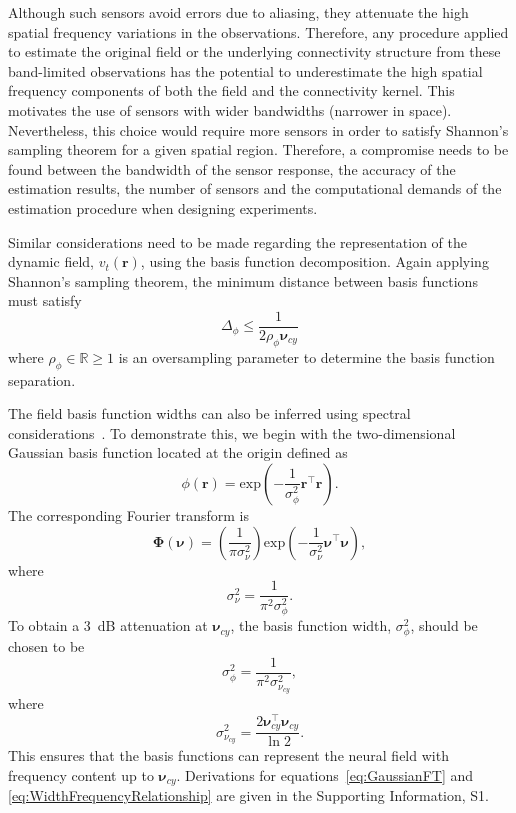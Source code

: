 \documentclass[10pt]{article}
\begin{document}
Although such sensors avoid errors due to aliasing, they attenuate the high spatial frequency variations in the observations. Therefore, any procedure applied to estimate the original field or the underlying connectivity structure from these band-limited observations has the potential to underestimate the high spatial frequency components of both the field and the connectivity kernel. This motivates the use of sensors with wider bandwidths (narrower in space). Nevertheless, this choice would require more sensors in order to satisfy Shannon's sampling theorem for a given spatial region. Therefore, a compromise needs to be found between the bandwidth of the sensor response, the accuracy of the estimation results, the number of sensors and the computational demands of the estimation procedure when designing experiments.

Similar considerations need to be made regarding the representation of the dynamic field, $v_t(\mathbf{r})$, using the basis function decomposition. Again applying Shannon's sampling theorem, the minimum distance between basis functions must satisfy 
\begin{equation}\label{eq:BasisFunctionSeparation}
	\Delta_{\phi} \leq \frac{1}{2\rho_{\phi}\boldsymbol{\nu}_{cy}}
\end{equation}
where $\rho_{\phi} \in \mathbb{R} \ge 1$ is an oversampling parameter to determine the basis function separation. 

The field basis function widths can also be inferred using spectral considerations~\cite{Sanner1992,Scerri2009}. To demonstrate this, we begin with the two-dimensional Gaussian basis function located at the origin defined as
\begin{equation}\label{eq:BasisFunctionAtOrigin}
 \phi(\mathbf r)=\mathrm{exp}\left({-\frac{1}{\sigma_{\phi}^2} \mathbf r^\top\mathbf r}\right).
\end{equation}
The corresponding Fourier transform is
\begin{equation}\label{eq:GaussianFT}
\boldsymbol\Phi(\boldsymbol \nu)=\left(\frac{1}{\pi\sigma_{\nu}^2}\right)\mathrm{exp}\left(-\frac{1}{\sigma_{\nu}^2}\boldsymbol\nu^\top \boldsymbol\nu\right),
\end{equation}
where 
\begin{equation}\label{eq:GaussianFTWidth}
	\sigma^2_{\nu} = \frac{1}{\pi^2\sigma_{\phi}^2}. 
\end{equation}
To obtain a 3~dB attenuation at $\boldsymbol\nu_{cy}$, the basis function width, $\sigma^2_{\phi}$, should be chosen to be
\begin{equation}\label{eq:WidthCutOffRelationship}
 \sigma^2_{\phi}= \frac{1}{\pi^2\sigma_{\nu_{cy}}^2},
\end{equation}
where
\begin{equation}\label{eq:WidthFrequencyRelationship}
 \sigma^2_{\nu_{cy}}= \frac{2\boldsymbol\nu_{cy}^\top \boldsymbol\nu_{cy}}{\ln2}.
\end{equation}
This ensures that the basis functions can represent the neural field with frequency content up to $\boldsymbol\nu_{cy}$. Derivations for equations~\ref{eq:GaussianFT} and \ref{eq:WidthFrequencyRelationship} are given in the Supporting Information, S1.
\end{document}
